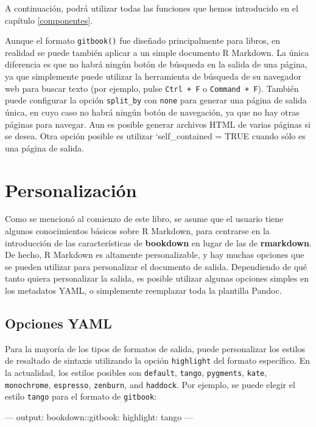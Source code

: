 \documentclass[12pt,]{krantz}
\makeatletter
\newenvironment{Shaded}{\begin{snugshade}}{\end{snugshade}}
\newcommand{\OtherTok}[1]{\textcolor[rgb]{0.56,0.35,0.01}{{#1}}}
\newcommand{\FunctionTok}[1]{\textcolor[rgb]{0.00,0.00,0.00}{{#1}}}
\newcommand{\NormalTok}[1]{{#1}}
\newenvironment{kframe}{%
\medskip{}
\setlength{\fboxsep}{.8em}
 \def\at@end@of@kframe{}%
 \ifinner\ifhmode%
  \def\at@end@of@kframe{\end{minipage}}%
  \begin{minipage}{\columnwidth}%
 \fi\fi%
 \def\FrameCommand##1{\hskip\@totalleftmargin \hskip-\fboxsep
 \colorbox{shadecolor}{##1}\hskip-\fboxsep
     \hskip-\linewidth \hskip-\@totalleftmargin \hskip\columnwidth}%
 \MakeFramed {\advance\hsize-\width
   \@totalleftmargin\z@ \linewidth\hsize
   \@setminipage}}%
 {\par\unskip\endMakeFramed%
 \at@end@of@kframe}
\renewenvironment{Shaded}{\begin{kframe}}{\end{kframe}}
\theoremstyle{definition}
\theoremstyle{definition}
\theoremstyle{remark}
\makeatother
\begin{document}
A continuación, podrá utilizar todas las funciones que hemos introducido
en el capítulo \ref{componentes}.

Aunque el formato \texttt{gitbook()} fue diseñado principalmente para
libros, en realidad se puede también aplicar a un simple documento R
Markdown. La única diferencia es que no habrá ningún botón de búsqueda
en la salida de una página, ya que simplemente puede utilizar la
herramienta de búsqueda de su navegador web para buscar texto (por
ejemplo, pulse \texttt{Ctrl\ +\ F} o \texttt{Command\ +\ F}). También
puede configurar la opción \texttt{split\_by} con \texttt{none} para
generar una página de salida única, en cuyo caso no habrá ningún botón
de navegación, ya que no hay otras páginas para navegar. Aun es posible
generar archivos HTML de varias páginas si se desea. Otra opción posible
es utilizar `self\_contained = TRUE cuando sólo es una página de salida.

\chapter{Personalización}\label{personalizacion}

Como se mencionó al comienzo de este libro, se asume que el usuario
tiene algunos conocimientos básicos sobre R Markdown, para centrarse en
la introducción de las características de \textbf{bookdown} en lugar de
las de \textbf{rmarkdown}. De hecho, R Markdown es altamente
personalizable, y hay muchas opciones que se pueden utilizar para
personalizar el documento de salida. Dependiendo de qué tanto quiera
personalizar la salida, es posible utilizar algunas opciones simples en
los metadatos YAML, o simplemente reemplazar toda la plantilla Pandoc.

\section{Opciones YAML}\label{opciones-yaml}

Para la mayoría de los tipos de formatos de salida, puede
personalizar los estilos de resaltado de sintaxis utilizando la opción
\texttt{highlight} del formato específico. En la actualidad, los estilos
posibles son \texttt{default}, \texttt{tango}, \texttt{pygments},
\texttt{kate}, \texttt{monochrome}, \texttt{espresso}, \texttt{zenburn},
and \texttt{haddock}. Por ejemplo, se puede elegir el estilo
\texttt{tango} para el formato de \texttt{gitbook}:

\begin{Shaded}
\begin{Highlighting}[]
\OtherTok{---}
\FunctionTok{output:}
  \FunctionTok{bookdown:}\NormalTok{:gitbook:}
    \FunctionTok{highlight:} \NormalTok{tango}
\OtherTok{---}
\end{Highlighting}
\end{Shaded}
\end{document}
